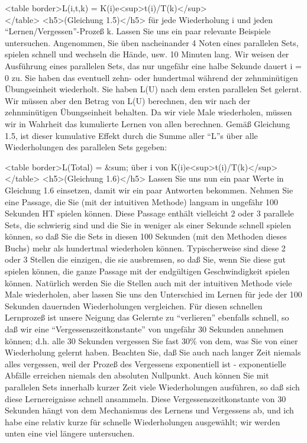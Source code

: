<table border>L(i,t,k) = K(i)e<sup>\-t(i)/T(k)</sup> \\ </table>
<h5>(Gleichung 1.5)</h5>
für jede Wiederholung i und jeden \enquote{Lernen/Vergessen}-Prozeß k.
Lassen Sie uns ein paar relevante Beispiele untersuchen.
Angenommen, Sie üben nacheinander 4 Noten eines parallelen Sets, spielen schnell und wechseln die Hände, usw. 10 Minuten lang.
Wir weisen der Ausführung eines parallelen Sets, das nur ungefähr eine halbe Sekunde dauert i = 0 zu.
Sie haben das eventuell zehn- oder hundertmal während der zehnminütigen Übungseinheit wiederholt.
Sie haben L(U) nach dem ersten parallelen Set gelernt.
Wir müssen aber den Betrag von L(U) berechnen, den wir nach der zehnminütigen Übungseinheit behalten.
Da wir viele Male wiederholen, müssen wir in Wahrheit das kumulierte Lernen von allen berechnen.
Gemäß Gleichung 1.5, ist dieser kumulative Effekt durch die Summe aller \enquote{L}s über alle Wiederholungen des parallelen Sets gegeben:

<table border>L(Total) = &sum; über i von K(i)e<sup>\-t(i)/T(k)</sup> \\ </table>
<h5>(Gleichung 1.6)</h5>
Lassen Sie uns nun ein paar Werte in Gleichung 1.6 einsetzen, damit wir ein paar Antworten bekommen.
Nehmen Sie eine Passage, die Sie (mit der intuitiven Methode) langsam in ungefähr 100 Sekunden HT spielen können.
Diese Passage enthält vielleicht 2 oder 3 parallele Sets, die schwierig sind und die Sie in weniger als einer Sekunde schnell spielen können, so daß Sie die Sets in diesen 100 Sekunden (mit den Methoden dieses Buchs) mehr als hundertmal wiederholen können.
Typischerweise sind diese 2 oder 3 Stellen die einzigen, die sie ausbremsen, so daß Sie, wenn Sie diese gut spielen können, die ganze Passage mit der endgültigen Geschwindigkeit spielen können.
Natürlich werden Sie die Stellen auch mit der intuitiven Methode viele Male wiederholen, aber lassen Sie uns den Unterschied im Lernen für jede der 100 Sekunden dauernden Wiederholungen vergleichen.
Für diesen schnellen Lernprozeß ist unsere Neigung das Gelernte zu \enquote{verlieren} ebenfalls schnell, so daß wir eine \enquote{Vergessenszeitkonstante} von ungefähr 30 Sekunden annehmen können; d.h. alle 30 Sekunden vergessen Sie fast 30\% von dem, was Sie von einer Wiederholung gelernt haben.
Beachten Sie, daß Sie auch nach langer Zeit niemals alles vergessen, weil der Prozeß des Vergessens exponentiell ist - exponentielle Abfälle erreichen niemals den absoluten Nullpunkt.
Auch können Sie mit parallelen Sets innerhalb kurzer Zeit viele Wiederholungen ausführen, so daß sich diese Lernereignisse schnell ansammeln.
Diese Vergessenszeitkonstante von 30 Sekunden hängt von dem Mechanismus des Lernens und Vergessens ab, und ich habe eine relativ kurze für schnelle Wiederholungen ausgewählt; wir werden unten eine viel längere untersuchen.

